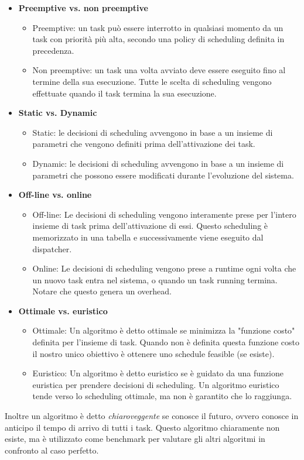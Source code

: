 \documentclass[12pt]{article}
\begin{document}
\begin{itemize}
    \item \textbf{Preemptive vs. non preemptive}
    \begin{itemize}
        \item Preemptive: un task può essere interrotto in qualsiasi momento da un task con priorità più alta, secondo una policy di scheduling definita in precedenza.
        \item Non preemptive: un task una volta avviato deve essere eseguito fino al termine della sua esecuzione. Tutte le scelta di scheduling vengono effettuate quando il task termina la sua esecuzione.
    \end{itemize}
    \item \textbf{Static vs. Dynamic}
    \begin{itemize}
        \item Static: le decisioni di scheduling avvengono in base a un insieme di parametri che vengono definiti prima dell'attivazione dei task.
        \item Dynamic: le decisioni di scheduling avvengono in base a un insieme di parametri che possono essere modificati durante l'evoluzione del sistema.
    \end{itemize}
    \item \textbf{Off-line vs. online} 
    \begin{itemize}
        \item Off-line: Le decisioni di scheduling vengono interamente prese per l'intero insieme di task prima dell'attivazione di essi.
        Questo scheduling è memorizzato in una tabella e successivamente viene eseguito dal dispatcher.
        \item Online: Le decisioni di scheduling vengono prese a runtime ogni volta che un nuovo task entra nel sistema, o quando un task running termina. Notare che questo genera un overhead.
    \end{itemize}
    \item \textbf{Ottimale vs. euristico}
    \begin{itemize}
        \item Ottimale: Un algoritmo è detto ottimale se minimizza la "funzione costo" definita per l'insieme di task.
        Quando non è definita questa funzione costo il nostro unico obiettivo è ottenere uno schedule feasible (se esiste).
        \item Euristico: Un algoritmo è detto euristico se è guidato da una funzione euristica per prendere decisioni di scheduling.
        Un algoritmo euristico tende verso lo scheduling ottimale, ma non è garantito che lo raggiunga.
    \end{itemize}
\end{itemize}
Inoltre un algoritmo è detto \textit{chiaroveggente} se conosce il futuro, ovvero conosce in anticipo il tempo di arrivo di tutti i task. Questo algoritmo chiaramente non esiste, ma è utilizzato come benchmark per valutare gli altri algoritmi in confronto al caso perfetto.
\end{document}
